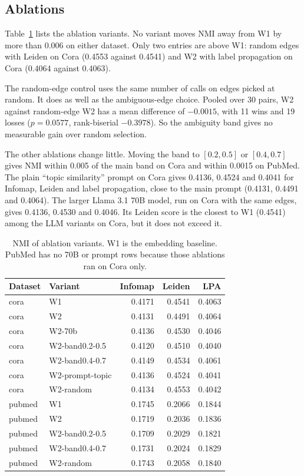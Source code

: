 \subsection{Ablations}
Table~\ref{tab:ablation} lists the ablation variants. No variant moves NMI away from W1 by more than 0.006 on either dataset. Only two entries are above W1: random edges with Leiden on Cora (0.4553 against 0.4541) and W2 with label propagation on Cora (0.4064 against 0.4063).

The random-edge control uses the same number of calls on edges picked at random. It does as well as the ambiguous-edge choice. Pooled over 30 pairs, W2 against random-edge W2 has a mean difference of $-0.0015$, with 11 wins and 19 losses ($p=0.0577$, rank-biserial $-0.3978$). So the ambiguity band gives no measurable gain over random selection.

The other ablations change little. Moving the band to $[0.2,0.5]$ or $[0.4,0.7]$ gives NMI within 0.005 of the main band on Cora and within 0.0015 on PubMed. The plain ``topic similarity'' prompt on Cora gives 0.4136, 0.4524 and 0.4041 for Infomap, Leiden and label propagation, close to the main prompt (0.4131, 0.4491 and 0.4064). The larger Llama 3.1 70B model, run on Cora with the same edges, gives 0.4136, 0.4530 and 0.4046. Its Leiden score is the closest to W1 (0.4541) among the LLM variants on Cora, but it does not exceed it.

\begin{table}[!t]
\centering
\caption{NMI of ablation variants. W1 is the embedding baseline. PubMed has no 70B or prompt rows because those ablations ran on Cora only.}
\label{tab:ablation}
\footnotesize
\begin{tabular}{@{}llrrr@{}}
\toprule
Dataset & Variant & Infomap & Leiden & LPA \\
\midrule
cora & W1 & 0.4171 & 0.4541 & 0.4063 \\
cora & W2 & 0.4131 & 0.4491 & 0.4064 \\
cora & W2-70b & 0.4136 & 0.4530 & 0.4046 \\
cora & W2-band0.2-0.5 & 0.4120 & 0.4510 & 0.4040 \\
cora & W2-band0.4-0.7 & 0.4149 & 0.4534 & 0.4061 \\
cora & W2-prompt-topic & 0.4136 & 0.4524 & 0.4041 \\
cora & W2-random & 0.4134 & 0.4553 & 0.4042 \\
pubmed & W1 & 0.1745 & 0.2066 & 0.1844 \\
pubmed & W2 & 0.1719 & 0.2036 & 0.1836 \\
pubmed & W2-band0.2-0.5 & 0.1709 & 0.2029 & 0.1821 \\
pubmed & W2-band0.4-0.7 & 0.1731 & 0.2024 & 0.1829 \\
pubmed & W2-random & 0.1743 & 0.2058 & 0.1840 \\
\bottomrule
\end{tabular}
\end{table}


